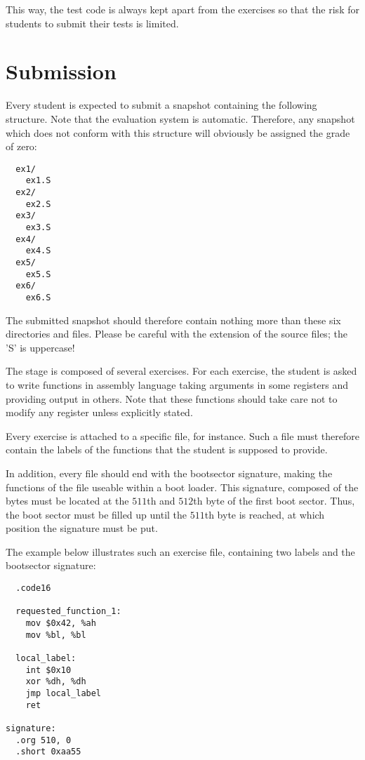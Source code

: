 This way, the test code is always kept apart from the exercises so that
the risk for students to submit their tests is limited.

%
%

\section{Submission}

Every student is expected to submit a snapshot containing the following
structure. Note that the evaluation system is automatic. Therefore, any
snapshot which does not conform with this structure will obviously be assigned
the grade of zero:

\begin{verbatim}
  ex1/
    ex1.S
  ex2/
    ex2.S
  ex3/
    ex3.S
  ex4/
    ex4.S
  ex5/
    ex5.S
  ex6/
    ex6.S
\end{verbatim}

The submitted snapshot should therefore contain nothing more than these
six directories and files. Please be careful with the extension of the source
files; the 'S' is uppercase!

The  stage is composed of several exercises. For each exercise,
the student is asked to write functions in assembly language taking arguments
in some registers and providing output in others. Note that these functions
should take care not to modify any register unless explicitly stated.

Every exercise is attached to a specific file,  for instance.
Such a file must therefore contain the labels of the functions that the student
is supposed to provide.

In addition, every file should end with the bootsector signature, making the
functions of the file useable within a boot loader. This signature, composed
of the bytes  must be located at the $511$th and $512$th byte
of the first boot sector. Thus, the boot sector must be filled up until the
$511$th byte is reached, at which position the signature must be put.

The example below illustrates such an exercise file, containing two
labels and the bootsector signature:

\begin{verbatim}
  .code16

  requested_function_1:
    mov $0x42, %ah
    mov %bl, %bl

  local_label:
    int $0x10
    xor %dh, %dh
    jmp local_label
    ret

signature:
  .org 510, 0
  .short 0xaa55
\end{verbatim}

